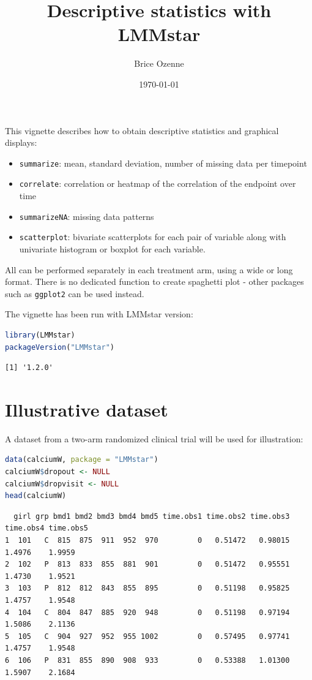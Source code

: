 \documentclass[12pt]{article}
\author{Brice Ozenne}
\date{\today}
\title{Descriptive statistics with LMMstar}
\begin{document}
\maketitle
This vignette describes how to obtain descriptive statistics and
graphical displays:
\begin{itemize}
\item \texttt{summarize}: mean, standard deviation, number of missing data per timepoint
\item \texttt{correlate}: correlation or heatmap of the correlation of the endpoint over time
\item \texttt{summarizeNA}: missing data patterns
\item \texttt{scatterplot}: bivariate scatterplots for each pair of variable
along with univariate histogram or boxplot for each variable.
\end{itemize}

All can be performed separately in each treatment arm, using a wide or
long format. There is no dedicated function to create spaghetti plot -
other packages such as \texttt{ggplot2} can be used instead.

\bigskip

The vignette has been run with LMMstar version:
\begin{lstlisting}[language=r,numbers=none]
library(LMMstar)
packageVersion("LMMstar")
\end{lstlisting}

\label{}
\begin{verbatim}
[1] '1.2.0'
\end{verbatim}


\clearpage
\section{Illustrative dataset}
\label{sec:org4861636}

A dataset from a two-arm randomized clinical trial will be used for
illustration:

\begin{lstlisting}[language=r,numbers=none]
data(calciumW, package = "LMMstar")
calciumW$dropout <- NULL
calciumW$dropvisit <- NULL
head(calciumW)
\end{lstlisting}

\label{}
\begin{verbatim}
  girl grp bmd1 bmd2 bmd3 bmd4 bmd5 time.obs1 time.obs2 time.obs3 time.obs4 time.obs5
1  101   C  815  875  911  952  970         0   0.51472   0.98015    1.4976    1.9959
2  102   P  813  833  855  881  901         0   0.51472   0.95551    1.4730    1.9521
3  103   P  812  812  843  855  895         0   0.51198   0.95825    1.4757    1.9548
4  104   C  804  847  885  920  948         0   0.51198   0.97194    1.5086    2.1136
5  105   C  904  927  952  955 1002         0   0.57495   0.97741    1.4757    1.9548
6  106   P  831  855  890  908  933         0   0.53388   1.01300    1.5907    2.1684
\end{verbatim}
\end{document}
